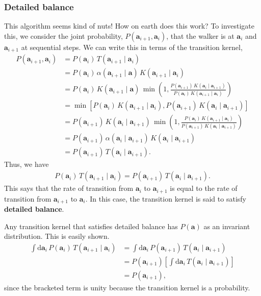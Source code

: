 \subsubsection{Detailed balance}
This algorithm seems kind of nuts!  How on earth does this work?  To
investigate this, we consider the joint probability,
$P(\mathbf{a}_{i+1}, \mathbf{a}_i)$, that the walker is at
$\mathbf{a}_i$ and $\mathbf{a}_{i+1}$ at sequential steps.  We can
write this in terms of the transition kernel,
\begin{align}
P(\mathbf{a}_{i+1}, \mathbf{a}_i) &= P(\mathbf{a}_i)\,T(\mathbf{a}_{i+1}\mid \mathbf{a}_i) \nonumber \\
 &= P(\mathbf{a}_i)\,\alpha(\mathbf{a}_{i+1}\mid \mathbf{a})\,K(\mathbf{a}_{i+1}\mid \mathbf{a}_i) \nonumber \\
&= P(\mathbf{a}_i)\,K(\mathbf{a}_{i+1}\mid \mathbf{a})\,\min\left(1, \frac{P(\mathbf{a}_{i+1})\,K(\mathbf{a}_i\mid \mathbf{a}_{i+1})}
    {P(\mathbf{a}_i)\,K(\mathbf{a}_{i+1}\mid \mathbf{a}_i)}\right) \nonumber \\
&= \min\left[P(\mathbf{a}_i)\,K(\mathbf{a}_{i+1}\mid \mathbf{a}_i),
P(\mathbf{a}_{i+1})\,K(\mathbf{a}_i\mid \mathbf{a}_{i+1})\right] \nonumber \\
&= P(\mathbf{a}_{i+1})\,K(\mathbf{a}_i\mid \mathbf{a}_{i+1})\,\min\left(1,\frac{P(\mathbf{a}_i)\,K(\mathbf{a}_{i+1}\mid \mathbf{a}_i)}{P(\mathbf{a}_{i+1})\,K(\mathbf{a}_i\mid \mathbf{a}_{i+1})}\right) \nonumber \\
&= P(\mathbf{a}_{i+1})\, \alpha(\mathbf{a}_i\mid \mathbf{a}_{i+1})\,K(\mathbf{a}_i\mid \mathbf{a}_{i+1})\, \nonumber \\
&= P(\mathbf{a}_{i+1})\, T(\mathbf{a}_i\mid \mathbf{a}_{i+1}).
\end{align}
Thus, we have
\begin{align}
P(\mathbf{a}_i)\,T(\mathbf{a}_{i+1}\mid \mathbf{a}_i) = P(\mathbf{a}_{i+1})\, T(\mathbf{a}_i\mid \mathbf{a}_{i+1}).
\end{align}
This says that the rate of transition from $\mathbf{a}_i$ to
$\mathbf{a}_{i+1}$ is equal to the rate of transition from
$\mathbf{a}_{i+1}$ to $\mathbf{a}_i$.  In this case, the transition
kernel is said to satisfy \textbf{detailed balance}.

Any transition kernel that satisfies detailed balance has
$P(\mathbf{a})$ as an invariant distribution.  This is easily shown.
\begin{align}
\int \mathrm{d}\mathbf{a}_i \,P(\mathbf{a}_i)\,T(\mathbf{a}_{i+1}\mid \mathbf{a}_i) 
&= \int \mathrm{d}\mathbf{a}_i\,P(\mathbf{a}_{i+1})\, T(\mathbf{a}_i\mid \mathbf{a}_{i+1}) \nonumber \\
&= P(\mathbf{a}_{i+1})\left[\int \mathrm{d}\mathbf{a}_i\, T(\mathbf{a}_i\mid \mathbf{a}_{i+1})\right] \nonumber \\
&= P(\mathbf{a}_{i+1}),
\end{align}
since the bracketed term is unity because the transition kernel is a
probability.

